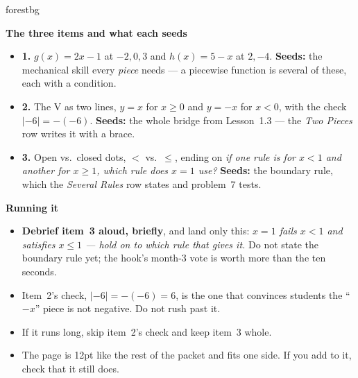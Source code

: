 \documentclass[10pt]{article}
\begin{document}
\begin{fixedskillbox}{forestbg}
\begin{minipage}[t]{0.48\linewidth}
    \textbf{The three items and what each seeds}
    \begin{itemize}
        \item \textbf{1.} $g(x)=2x-1$ at $-2,0,3$ and $h(x)=5-x$ at $2,-4$. \textbf{Seeds:} the
              mechanical skill every \emph{piece} needs --- a piecewise function is several of
              these, each with a condition.
        \item \textbf{2.} The V as two lines, $y=x$ for $x\ge0$ and $y=-x$ for $x<0$, with the
              check $|-6|=-(-6)$. \textbf{Seeds:} the whole bridge from Lesson~1.3 --- the
              \emph{Two Pieces} row writes it with a brace.
        \item \textbf{3.} Open vs.\ closed dots, $<$ vs.\ $\le$, ending on \emph{if one rule is
              for $x<1$ and another for $x\ge1$, which rule does $x=1$ use?} \textbf{Seeds:} the
              boundary rule, which the \emph{Several Rules} row states and problem~7 tests.
    \end{itemize}
\end{minipage}
\hfill
\begin{minipage}[t]{0.48\linewidth}
    \textbf{Running it}
    \begin{itemize}
        \item \textbf{Debrief item~3 aloud, briefly}, and land only this: \emph{$x=1$ fails $x<1$
              and satisfies $x\le1$ --- hold on to which rule that gives it.} Do not state the
              boundary rule yet; the hook's month-3 vote is worth more than the ten seconds.
        \item Item~2's check, $|-6|=-(-6)=6$, is the one that convinces students the ``$-x$''
              piece is not negative. Do not rush past it.
        \item If it runs long, skip item~2's check and keep item~3 whole.
        \item The page is 12pt like the rest of the packet and fits one side. If you add to it,
              check that it still does.
    \end{itemize}
\end{minipage}
\end{fixedskillbox}
\end{document}
